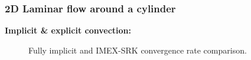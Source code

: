 \begin{frame}
\frametitle{2D Laminar flow around a cylinder}
\textbf{Implicit \& explicit convection:}
\begin{figure}[h!]
  \centering
  \caption{Fully implicit and IMEX-SRK convergence rate comparison.}
  \label{fig:IMEX_RK_cyl_conv_impl_expl}
\end{figure}
\end{frame}


